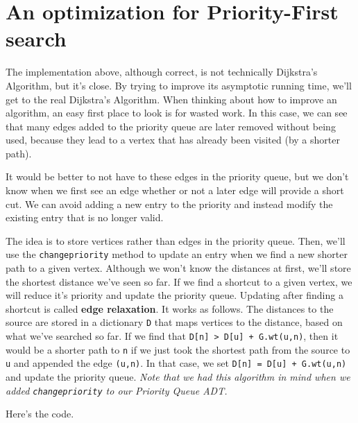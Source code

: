\section{An optimization for Priority-First search}


The implementation above, although correct, is not technically Dijkstra's Algorithm, but it's close.
By trying to improve its asymptotic running time, we'll get to the real Dijkstra's Algorithm.
When thinking about how to improve an algorithm, an easy first place to look is for wasted work.
In this case, we can see that many edges added to the priority queue are later removed without being used, because they lead to a vertex that has already been visited (by a shorter path).


It would be better to not have to these edges in the priority queue, but we don't know when we first see an edge whether or not a later edge will provide a short cut.
We can avoid adding a new entry to the priority and instead modify the existing entry that is no longer valid.


The idea is to store vertices rather than edges in the priority queue.
Then, we'll use the \texttt{changepriority} method to update an entry when we find a new shorter path to a given vertex.
Although we won't know the distances at first, we'll store the shortest distance we've seen so far.
If we find a shortcut to a given vertex, we will reduce it's priority and update the priority queue.
Updating after finding a shortcut is called \textbf{edge relaxation}.
It works as follows.
The distances to the source are stored in a dictionary \texttt{D} that maps vertices to the distance, based on what we've searched so far.
If we find that \texttt{D[n] > D[u] + G.wt(u,n)}, then it would be a shorter path to \texttt{n} if we just took the shortest path from the source to \texttt{u} and appended the edge \texttt{(u,n)}.  In that case, we set \texttt{D[n] = D[u] + G.wt(u,n)} and update the priority queue.
\emph{Note that we had this algorithm in mind when we added \texttt{changepriority} to our Priority Queue ADT.}


Here's the code.

